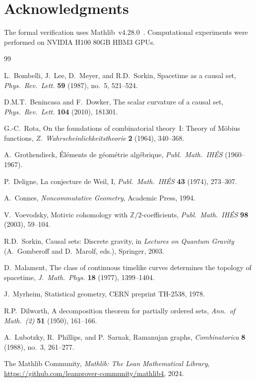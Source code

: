\documentclass[11pt,a4paper]{article}
\theoremstyle{plain}
\theoremstyle{definition}
\theoremstyle{remark}
\newcommand{\Z}{\mathbb{Z}}
\begin{document}
\section*{Acknowledgments}

The formal verification uses Mathlib~v4.28.0~\cite{mathlib}.
Computational experiments were performed on NVIDIA H100 80GB HBM3 GPUs.


\begin{thebibliography}{99}

L.~Bombelli, J.~Lee, D.~Meyer, and R.D.~Sorkin,
Spacetime as a causal set,
\emph{Phys.\ Rev.\ Lett.} \textbf{59} (1987), no.~5, 521--524.

D.M.T.~Benincasa and F.~Dowker,
The scalar curvature of a causal set,
\emph{Phys.\ Rev.\ Lett.} \textbf{104} (2010), 181301.

G.-C.~Rota,
On the foundations of combinatorial theory~I: Theory of M\"obius functions,
\emph{Z.\ Wahrscheinlichkeitstheorie} \textbf{2} (1964), 340--368.

A.~Grothendieck,
\'El\'ements de g\'eom\'etrie alg\'ebrique,
\emph{Publ.\ Math.\ IH\'ES} (1960--1967).

P.~Deligne,
La conjecture de Weil, I,
\emph{Publ.\ Math.\ IH\'ES} \textbf{43} (1974), 273--307.

A.~Connes,
\emph{Noncommutative Geometry}, Academic Press, 1994.

V.~Voevodsky,
Motivic cohomology with $\Z/2$-coefficients,
\emph{Publ.\ Math.\ IH\'ES} \textbf{98} (2003), 59--104.

R.D.~Sorkin,
Causal sets: Discrete gravity,
in \emph{Lectures on Quantum Gravity} (A.~Gomberoff and D.~Marolf, eds.), Springer, 2003.

D.~Malament,
The class of continuous timelike curves determines the topology of spacetime,
\emph{J.\ Math.\ Phys.} \textbf{18} (1977), 1399--1404.

J.~Myrheim,
Statistical geometry,
CERN preprint TH-2538, 1978.

R.P.~Dilworth,
A decomposition theorem for partially ordered sets,
\emph{Ann.\ of Math.\ (2)} \textbf{51} (1950), 161--166.

A.~Lubotzky, R.~Phillips, and P.~Sarnak,
Ramanujan graphs,
\emph{Combinatorica} \textbf{8} (1988), no.~3, 261--277.

The Mathlib Community,
\emph{Mathlib: The Lean Mathematical Library},
\url{https://github.com/leanprover-community/mathlib4}, 2024.

\end{thebibliography}
\end{document}
